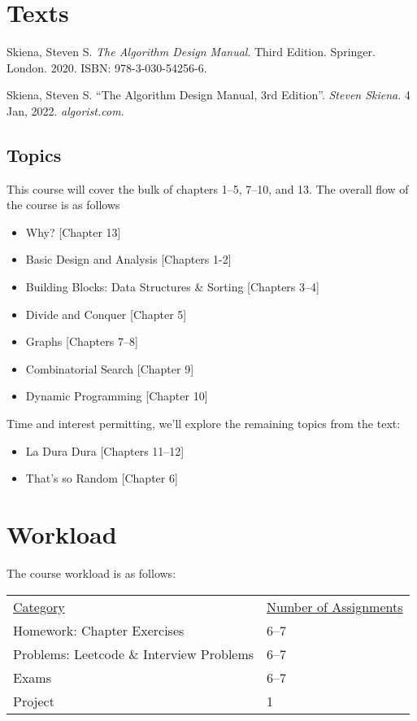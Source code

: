 \documentclass[10pt]{article}
\begin{document}
\section{Texts}

Skiena, Steven S. \textit{The Algorithm Design Manual}. Third Edition. Springer. London. 2020.
\newline ISBN: 978-3-030-54256-6.
\vspace{.15in} \newline

Skiena, Steven S. ``The Algorithm Design Manual, 3rd Edition''. \textit{Steven Skiena}. 4 Jan, 2022. \textit{algorist.com}.
\vspace{.15in} \newline


\subsection{Topics}

This course will cover the bulk of chapters 1--5, 7--10, and 13. The overall flow of the course is as follows
\begin{itemize}
\item Why? [Chapter 13]
\item Basic Design and Analysis [Chapters 1-2]
\item Building Blocks: Data Structures \& Sorting [Chapters 3--4]
\item Divide and Conquer [Chapter 5]
\item Graphs [Chapters 7--8]
\item Combinatorial Search [Chapter 9]
\item Dynamic Programming [Chapter 10]
\end{itemize}

Time and interest permitting, we'll explore the remaining topics from the text:
\begin{itemize}
  \item La Dura Dura [Chapters 11--12]
  \item That's so Random [Chapter 6]
\end{itemize}

\section{Workload}

The course workload is as follows:
\begin{center}
  \begin{tabular}{ll}
    \underline{Category} & \underline{Number of Assignments} \\
     Homework: Chapter Exercises & 6--7 \\
     Problems: Leetcode \& Interview Problems & 6--7 \\
     Exams & 6--7 \\
     Project & 1 \\
   \end{tabular}
 \end{center}
\end{document}
